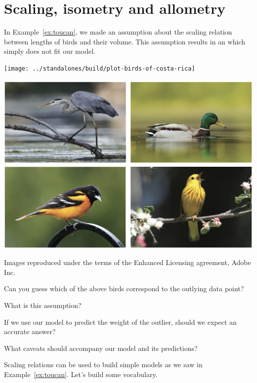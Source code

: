 \documentclass[../main.tex]{subfiles}
\begin{document}
 \section{Scaling, isometry and allometry}
In Example~\ref{ex:toucan}, we made an assumption about the scaling relation between lengths of birds and their volume. This assumption results in an  which simply does not fit our model.  

\begin{minipage}{.5\textwidth}
  \texttt{[image: ../standalones/build/plot-birds-of-costa-rica]}
\end{minipage}
\begin{minipage}{.5\textwidth}
  \includegraphics[width=\textwidth]{../standalones/image-birds.png}

  {\footnotesize{} Images reproduced under the terms of the Enhanced Licensing agreement, Adobe Inc.}
\end{minipage}

Can you guess which of the above birds correspond to the outlying data point? 

What is this assumption?

If we use our model to predict the weight of the outlier, should we expect an accurate answer?

What caveats should accompany our model and its predictions?

\clearpage

Scaling relations can be used to build simple models as we saw in Example~\ref{ex:toucan}. Let's build some vocabulary.
\end{document}
